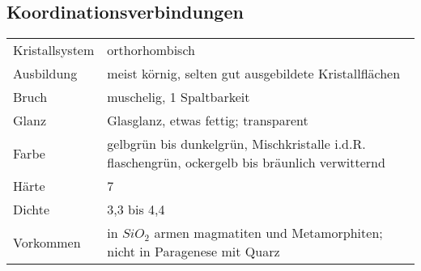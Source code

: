 \documentclass[a4paper,12pt]{scrartcl}
\begin{document}
\subsection{Koordinationsverbindungen}


\begin{tabular}{ll}
Kristallsystem & orthorhombisch\\
Ausbildung & meist körnig, selten gut ausgebildete Kristallflächen\\
Bruch & muschelig, 1 Spaltbarkeit\\
Glanz & Glasglanz, etwas fettig; transparent\\
Farbe & gelbgrün bis dunkelgrün, Mischkristalle i.d.R. flaschengrün, ockergelb bis bräunlich verwitternd\\
Härte & 7\\
Dichte & 3,3 bis 4,4\\
Vorkommen & in $SiO_2$ armen magmatiten und Metamorphiten; nicht in Paragenese mit Quarz\\
\end{tabular}
\end{document}

